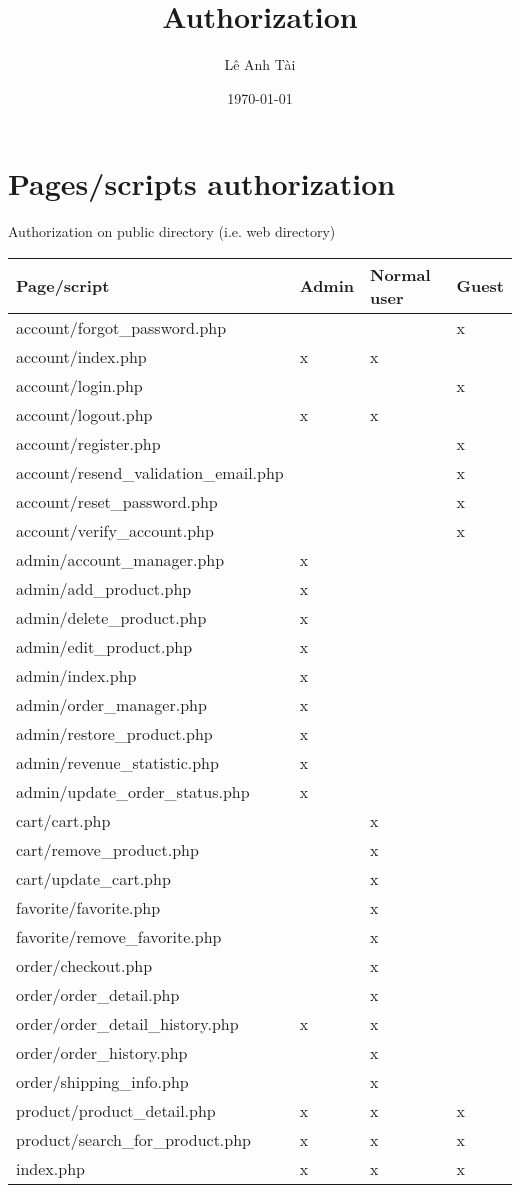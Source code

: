\documentclass[11pt]{article}
\author{Lê Anh Tài}
\date{\today}
\title{Authorization}
\begin{document}
\maketitle
\tableofcontents

\section{Pages/scripts authorization}
\label{sec:org47f618e}
Authorization on public directory (i.e. web directory)
\begin{center}
\begin{tabular}{llll}
Page/script & Admin & Normal user & Guest\\
\hline
account/forgot\_password.php &  &  & x\\
account/index.php & x & x & \\
account/login.php &  &  & x\\
account/logout.php & x & x & \\
account/register.php &  &  & x\\
account/resend\_validation\_email.php &  &  & x\\
account/reset\_password.php &  &  & x\\
account/verify\_account.php &  &  & x\\
admin/account\_manager.php & x &  & \\
admin/add\_product.php & x &  & \\
admin/delete\_product.php & x &  & \\
admin/edit\_product.php & x &  & \\
admin/index.php & x &  & \\
admin/order\_manager.php & x &  & \\
admin/restore\_product.php & x &  & \\
admin/revenue\_statistic.php & x &  & \\
admin/update\_order\_status.php & x &  & \\
cart/cart.php &  & x & \\
cart/remove\_product.php &  & x & \\
cart/update\_cart.php &  & x & \\
favorite/favorite.php &  & x & \\
favorite/remove\_favorite.php &  & x & \\
order/checkout.php &  & x & \\
order/order\_detail.php &  & x & \\
order/order\_detail\_history.php & x & x & \\
order/order\_history.php &  & x & \\
order/shipping\_info.php &  & x & \\
product/product\_detail.php & x & x & x\\
product/search\_for\_product.php & x & x & x\\
index.php & x & x & x\\
\end{tabular}
\end{center}
\end{document}
